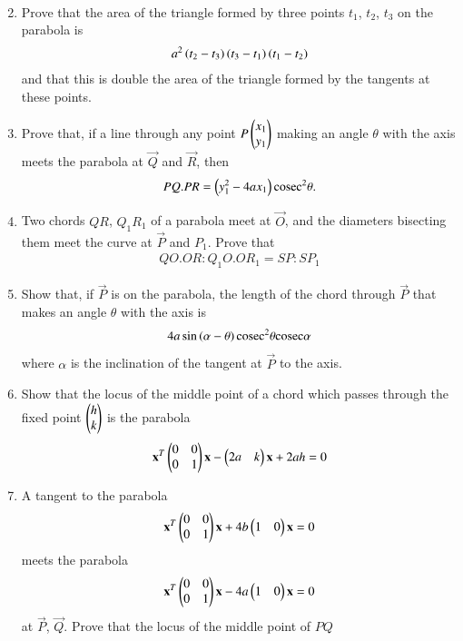 \begin{enumerate}[label=\arabic*.,ref=\thesubsection.\theenumi]
\begin{align}
\end{align}
\item Prove that the area of the triangle formed by three points $t_1$, $t_2$, $t_3$ on the parabola is
\begin{align}
a^2\left(t_2-t_3\right)\left(t_3-t_1\right)\left(t_1-t_2\right)
\end{align}
and that this is double the area of the triangle formed by the tangents at these points.
\item Prove that, if a line through any point $P \begin{pmatrix}x_1\\y_1\end{pmatrix}$ making an angle $\theta$ with the axis meets the parabola
at $\vec{Q}$ and $\vec{R}$, then
\begin{align}
PQ.PR = \left(y_1^2-4ax_1\right)\text{cosec}^2\theta.
\end{align}
\item Two chords $QR$, $Q_1R_1$ of a parabola meet at $\vec{O}$, and the diameters bisecting them meet the curve at $\vec{P}$ and $P_1$.  Prove that
\begin{align}
QO.OR:Q_1O.OR_1=SP:SP_1
\end{align}
\item Show that, if $\vec{P}$ is on the parabola, the length of the chord through $\vec{P}$ that makes an angle $\theta$ with the axis is
\begin{align}
4a\sin\left(\alpha-\theta\right)\text{cosec}^2\theta\text{cosec}\alpha
\end{align}
where $\alpha$ is the inclination of the tangent at $\vec{P}$ to the axis.
\item Show that the locus of the middle point of a chord which passes through the fixed point $\begin{pmatrix}h\\k\end{pmatrix}$ is the parabola
\begin{align}
\label{eq:parab_standard}
\mathbf{x}^T\begin{pmatrix}0 & 0\\0 & 1\end{pmatrix}\mathbf{x}-\begin{pmatrix}2a & k \end{pmatrix}\mathbf{x}+2ah= 0 
\end{align}
\item A tangent to the parabola 
\begin{align}
\mathbf{x}^T\begin{pmatrix}0 & 0\\0 & 1\end{pmatrix}\mathbf{x}+4b\begin{pmatrix}1 & 0 \end{pmatrix}\mathbf{x}= 0 
\end{align}
meets the parabola 
\begin{align}
\mathbf{x}^T\begin{pmatrix}0 & 0\\0 & 1\end{pmatrix}\mathbf{x}-4a\begin{pmatrix}1 & 0 \end{pmatrix}\mathbf{x}= 0 
\end{align}
at $\vec{P}$, $\vec{Q}$.  Prove that the locus of the middle point of $PQ$

\end{enumerate}
